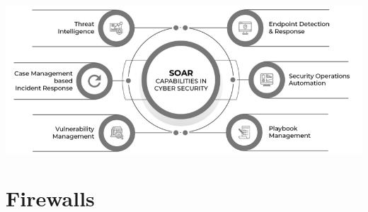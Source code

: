 \documentclass{article}
\begin{document}
\begin{center}
  \includegraphics[scale=0.4]{50}
\end{center}

\pagebreak

\section{Firewalls}
\end{document}
